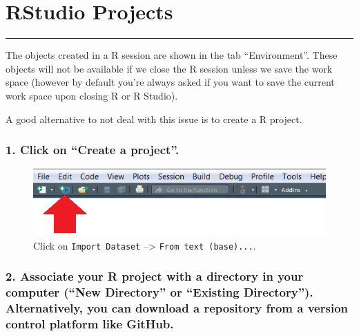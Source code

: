 \documentclass[
]{article}
\begin{document}
\hypertarget{rstudio-projects}{%
\section{RStudio Projects}\label{rstudio-projects}}

\begin{center}\rule{0.5\linewidth}{\linethickness}\end{center}

The objects created in a R session are shown in the tab ``Environment''.
These objects will not be available if we close the R session unless we
save the work space (however by default you're always asked if you want
to save the current work space upon closing R or R Studio).

A good alternative to not deal with this issue is to create a R project.

\hypertarget{click-on-create-a-project.}{%
\subsubsection{1. Click on ``Create a
project''.}\label{click-on-create-a-project.}}

\begin{figure}
\centering
\includegraphics{imgs/RProject.PNG}
\caption{Click on \texttt{Import\ Dataset} --\textgreater{}
\texttt{From\ text\ (base)...}.}
\end{figure}

\hypertarget{associate-your-r-project-with-a-directory-in-your-computer-new-directory-or-existing-directory.-alternatively-you-can-download-a-repository-from-a-version-control-platform-like-github.}{%
\subsubsection{2. Associate your R project with a directory in your
computer (``New Directory'' or ``Existing Directory''). Alternatively,
you can download a repository from a version control platform like
GitHub.}\label{associate-your-r-project-with-a-directory-in-your-computer-new-directory-or-existing-directory.-alternatively-you-can-download-a-repository-from-a-version-control-platform-like-github.}}
\end{document}
